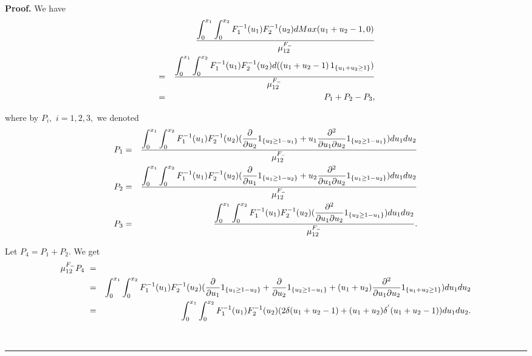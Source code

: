 \documentclass[onecolumn]{article}
\providecommand{\dint}{\displaystyle\int}
\newenvironment{proof}[1][Proof]{\noindent\textbf{#1.} }{\ \rule{0.5em}{0.5em}}
\renewcommand{\dint}{\displaystyle\int}
\begin{document}
\begin{proof}
We have%
\begin{eqnarray}
&&\frac{\dint\nolimits_{0}^{x_{1}}\dint%
\nolimits_{0}^{x_{2}}F_{1}^{-1}(u_{1})F_{2}^{-1}(u_{2})dMax(u_{1}+u_{2}-1,0)%
}{\mu _{12}^{F_{-}}}  \notag \\
&=&\frac{\dint\nolimits_{0}^{x_{1}}\dint%
\nolimits_{0}^{x_{2}}F_{1}^{-1}(u_{1})F_{2}^{-1}(u_{2})d(\left(
u_{1}+u_{2}-1\right) 1_{\left\{ u_{1}+u_{2}\geq 1\right\} })}{\mu
_{12}^{F_{-}}}  \label{35.2} \\
&=&P_{1}+P_{2}-P_{3},  \notag
\end{eqnarray}

where by $P_{i},$ $i=1,2,3,$ we denoted%
\begin{eqnarray}
P_{1} &=&\frac{\dint\nolimits_{0}^{x_{1}}\dint%
\nolimits_{0}^{x_{2}}F_{1}^{-1}(u_{1})F_{2}^{-1}(u_{2})(\frac{\partial }{%
\partial u_{2}}1_{\left\{ u_{2}\geq 1-u_{1}\right\} }+u_{1}\frac{\partial
^{2}}{\partial u_{1}\partial u_{2}}1_{\left\{ u_{2}\geq 1-u_{1}\right\}
})du_{1}du_{2}}{\mu _{12}^{F_{-}}}  \notag \\
P_{2} &=&\frac{\dint\nolimits_{0}^{x_{1}}\dint%
\nolimits_{0}^{x_{2}}F_{1}^{-1}(u_{1})F_{2}^{-1}(u_{2})(\frac{\partial }{%
\partial u_{1}}1_{\left\{ u_{1}\geq 1-u_{2}\right\} }+u_{2}\frac{\partial
^{2}}{\partial u_{1}\partial u_{2}}1_{\left\{ u_{1}\geq 1-u_{2}\right\}
})du_{1}du_{2}}{\mu _{12}^{F_{-}}}  \notag \\
P_{3} &=&\frac{\dint\nolimits_{0}^{x_{1}}\dint%
\nolimits_{0}^{x_{2}}F_{1}^{-1}(u_{1})F_{2}^{-1}(u_{2})(\frac{\partial ^{2}}{%
\partial u_{1}\partial u_{2}}1_{\left\{ u_{2}\geq 1-u_{1}\right\}
})du_{1}du_{2}}{\mu _{12}^{F_{-}}}.  \label{31}
\end{eqnarray}

Let $P_{4}=P_{1}+P_{2}$. We get%
\begin{eqnarray}
\mu _{12}^{F_{-}}P_{4}\text{ } &=&  \notag \\
&=&\dint\nolimits_{0}^{x_{1}}\dint%
\nolimits_{0}^{x_{2}}F_{1}^{-1}(u_{1})F_{2}^{-1}(u_{2})(\frac{\partial }{%
\partial u_{1}}1_{\left\{ u_{1}\geq 1-u_{2}\right\} }+\frac{\partial }{%
\partial u_{2}}1_{\left\{ u_{2}\geq 1-u_{1}\right\} }+(u_{1}+u_{2})\frac{%
\partial ^{2}}{\partial u_{1}\partial u_{2}}1_{\left\{ u_{1}+u_{2}\geq
1\right\} })du_{1}du_{2}  \notag \\
&=&\dint\nolimits_{0}^{x_{1}}\dint%
\nolimits_{0}^{x_{2}}F_{1}^{-1}(u_{1})F_{2}^{-1}(u_{2})(2\delta
(u_{1}+u_{2}-1)+(u_{1}+u_{2})\delta ^{^{\prime
}}(u_{1}+u_{2}-1))du_{1}du_{2}.  \label{32}
\end{eqnarray}


\end{proof}
\end{document}
